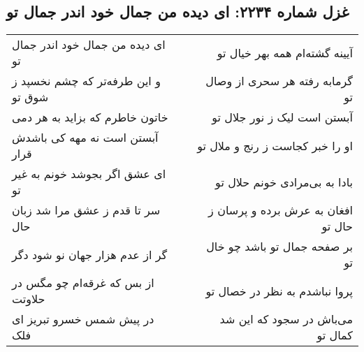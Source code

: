 \begin{center}
\section*{غزل شماره ۲۲۳۴: ای دیده من جمال خود اندر جمال تو}
\label{sec:2234}
\begin{longtable}{l p{0.5cm} r}
ای دیده من جمال خود اندر جمال تو
&&
آیینه گشته‌ام همه بهر خیال تو
\\
و این طرفه‌تر که چشم نخسپد ز شوق تو
&&
گرمابه رفته هر سحری از وصال تو
\\
خاتون خاطرم که بزاید به هر دمی
&&
آبستن است لیک ز نور جلال تو
\\
آبستن است نه مهه کی باشدش قرار
&&
او را خبر کجاست ز رنج و ملال تو
\\
ای عشق اگر بجوشد خونم به غیر تو
&&
بادا به بی‌مرادی خونم حلال تو
\\
سر تا قدم ز عشق مرا شد زبان حال
&&
افغان به عرش برده و پرسان ز حال تو
\\
گر از عدم هزار جهان نو شود دگر
&&
بر صفحه جمال تو باشد چو خال تو
\\
از بس که غرقه‌ام چو مگس در حلاوتت
&&
پروا نباشدم به نظر در خصال تو
\\
در پیش شمس خسرو تبریز ای فلک
&&
می‌باش در سجود که این شد کمال تو
\\
\end{longtable}
\end{center}
